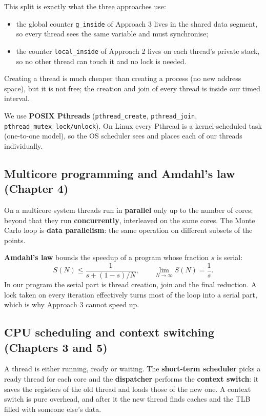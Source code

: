 \documentclass[11pt,a4paper]{article}
\newcommand{\code}[1]{\texttt{#1}}
\begin{document}
This split is exactly what the three approaches use:
\begin{itemize}[nosep]
  \item the global counter \code{g\_inside} of Approach 3 lives in the shared data segment, so every thread sees the same variable and must synchronise;
  \item the counter \code{local\_inside} of Approach 2 lives on each thread's private stack, so no other thread can touch it and no lock is needed.
\end{itemize}
Creating a thread is much cheaper than creating a process (no new address space), but it is not free; the creation and join of every thread is inside our timed interval.

We use \textbf{POSIX Pthreads} (\code{pthread\_create}, \code{pthread\_join}, \code{pthread\_mutex\_lock/unlock}). On Linux every Pthread is a kernel-scheduled task (one-to-one model), so the OS scheduler sees and places each of our threads individually.

\subsection{Multicore programming and Amdahl's law (Chapter 4)}
On a multicore system threads run in \textbf{parallel} only up to the number of cores; beyond that they run \textbf{concurrently}, interleaved on the same cores. The Monte Carlo loop is \textbf{data parallelism}: the same operation on different subsets of the points.

\textbf{Amdahl's law} bounds the speedup of a program whose fraction $s$ is serial:
\begin{equation}
  S(N) \le \frac{1}{s + (1-s)/N}, \qquad \lim_{N\to\infty} S(N) = \frac{1}{s}.
  \label{eq:amdahl}
\end{equation}
In our program the serial part is thread creation, join and the final reduction. A lock taken on every iteration effectively turns most of the loop into a serial part, which is why Approach 3 cannot speed up.

\subsection{CPU scheduling and context switching (Chapters 3 and 5)}
A thread is either running, ready or waiting. The \textbf{short-term scheduler} picks a ready thread for each core and the \textbf{dispatcher} performs the \textbf{context switch}: it saves the registers of the old thread and loads those of the new one. A context switch is pure overhead, and after it the new thread finds caches and the TLB filled with someone else's data.
\end{document}
